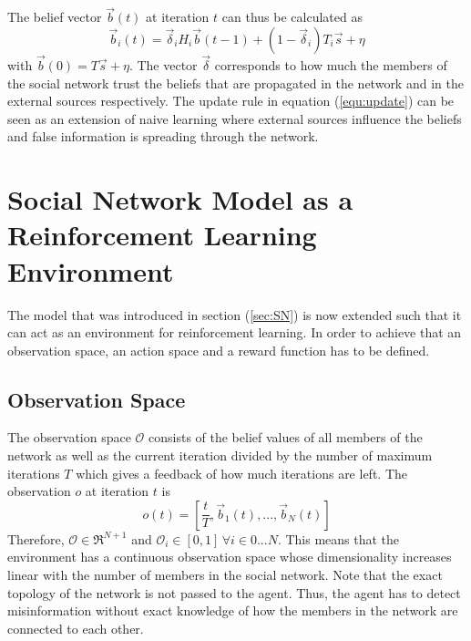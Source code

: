 \documentclass[11pt, a4paper]{article}
\newcommand{\matr}[1]{\bm{\mathit{#1}}}
\begin{document}
The belief vector $\vec{b}(t)$ at iteration $t$ can thus be calculated as
%
\begin{equation} \label{equ:update}
\vec{b}_i(t) = \vec{\delta}_i \matr{H}_i \vec{b}(t-1) + (1-\vec{\delta}_i)\matr{T}_i \vec{s}+\eta
\end{equation}
%
with $\vec{b}(0) = \matr{T} \vec{s}+\eta$. The vector $\vec{\delta}$ corresponds to how much the members of the social network trust the beliefs that are propagated in the network and in the external sources respectively. The update rule in equation (\ref{equ:update}) can be seen as an extension of naive learning where external sources influence the beliefs and false information is spreading through the network. \newline

\section{Social Network Model as a Reinforcement Learning Environment} \label{sec:SN_RLEnv}
The model that was introduced in section (\ref{sec:SN}) is now extended such that it can act as an environment for reinforcement learning. In order to achieve that an observation space, an action space and a reward function has to be defined.

\subsection{Observation Space}
The observation space $\mathcal{O}$ consists of the belief values of all members of the network as well as the current iteration divided by the number of maximum iterations $T$ which gives a feedback of how much iterations are left. The observation $o$ at iteration $t$ is
\begin{equation}
o(t)=[\frac{t}{T},\vec{b}_1(t),...,\vec{b}_{N}(t)]
\end{equation}
Therefore, $\mathcal{O} \in \Re^{N+1}$ and $\mathcal{O}_i \in [0,1] \, \forall i \in 0...N$. This means that the environment has a continuous observation space whose dimensionality increases linear with the number of members in the social network. \newline
Note that the exact topology of the network is not passed to the agent. Thus, the agent has to detect misinformation without exact knowledge of how the members in the network are connected to each other.
\end{document}
